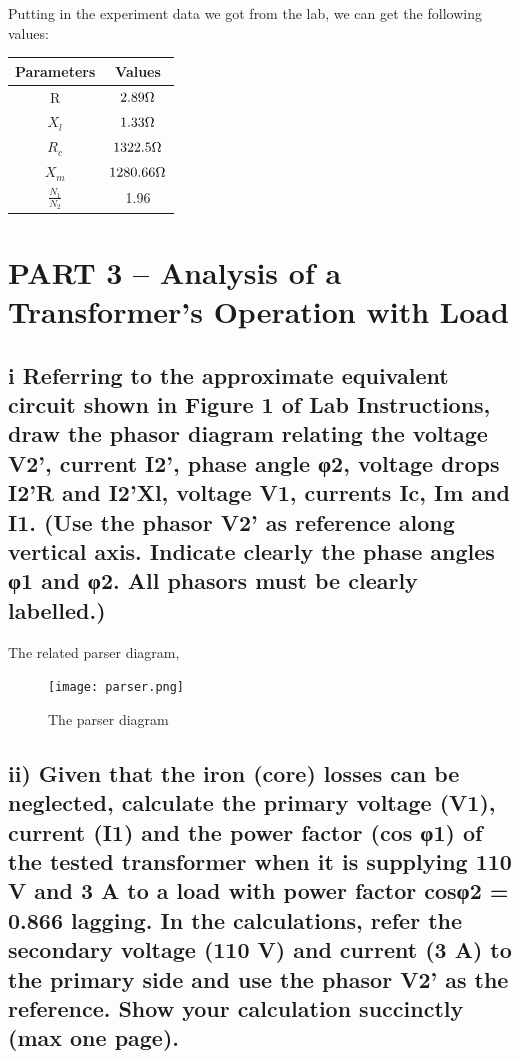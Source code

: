 \documentclass[11pt]{scrartcl}
\begin{document}
Putting in the experiment data we got from the lab, we can get the following values:
\begin{center}
\begin{tabular}{|c|c|}
\hline
Parameters & Values\\
\hline
R & $2.89 \ohm$\\
$X_l$ & $1.33\ohm$\\
$R_c$ & $1322.5\ohm$\\
$X_m$ & $1280.66 \ohm$\\
$\frac{N_1}{N_2}$ & 1.96\\
\hline
\end{tabular}
\end{center}

\section*{PART 3 – Analysis of a Transformer’s Operation with Load}

\subsection*{i Referring to the approximate equivalent circuit shown in Figure 1 of Lab Instructions, draw the phasor diagram relating the voltage V2', current I2', phase angle φ2, voltage drops I2'R and I2'Xl, voltage V1, currents Ic, Im and I1. (Use the phasor V2' as reference along vertical axis. Indicate clearly the phase angles φ1 and φ2.  All phasors must be clearly labelled.)}

\FloatBarrier
The related parser diagram,
\begin{figure}[h!]
\centering
\texttt{[image: parser.png]}
\caption{The parser diagram}
\end{figure}
\FloatBarrier




\subsection*{ii)   Given that the iron (core) losses can be neglected, calculate the primary voltage (V1), current (I1) and the power factor (cos φ1) of the tested transformer when it is supplying 110 V and 3 A to a load with power factor cosφ2 = 0.866 lagging. In the calculations, refer the secondary voltage (110 V) and current (3 A) to the primary side and use the phasor V2' as the reference. Show your calculation succinctly (max one page).}
\end{document}
